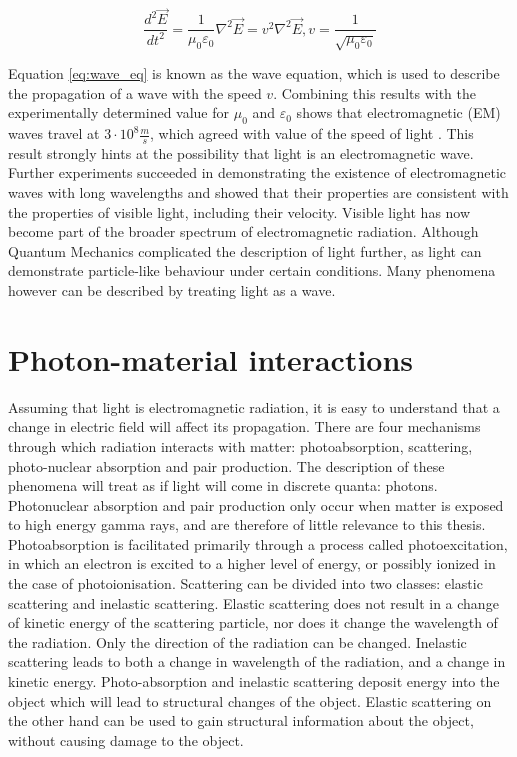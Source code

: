 \begin{equation}\label{eq:wave_eq}
\frac{d^2\vec{E}}{dt^2} = \frac{1}{\mu_0\varepsilon_0}\nabla^2 \vec{E} = v^2 \nabla^2 \vec{E},      v = \frac{1}{\sqrt{\mu_0\varepsilon_0}}
\end{equation}

Equation \ref{eq:wave_eq} is known as the wave equation, which is used to describe the propagation of a wave with the speed $v$. Combining this results with the experimentally determined value for $\mu_0$ and $\varepsilon_0$ shows that electromagnetic (EM) waves travel at \(3\cdot 10^8 \frac{m}{s}\), which agreed with value of the speed of light \cite{Froome1971}. This result strongly hints at the possibility that light is an electromagnetic wave. Further experiments succeeded in demonstrating the existence of electromagnetic waves with long wavelengths and showed that their properties are consistent with the properties of visible light, including their velocity. Visible light has now become part of the broader spectrum of electromagnetic radiation. Although Quantum Mechanics complicated the description of light further, as light can demonstrate particle-like behaviour under certain conditions. Many phenomena however can be described by treating light as a wave. 

\section{Photon-material interactions}
Assuming that light is electromagnetic radiation, it is easy to understand that a change in electric field will affect its propagation. There are four mechanisms through which radiation interacts with matter: photoabsorption, scattering, photo-nuclear absorption and pair production. The description of these phenomena will treat as if light will come in discrete quanta: photons. 
Photonuclear absorption and pair production only occur when matter is exposed to high energy gamma rays, and are therefore of little relevance to this thesis. Photoabsorption is facilitated primarily through a process called photoexcitation, in which an electron is excited to a higher level of energy, or possibly ionized in the case of photoionisation. Scattering can be divided into two classes: elastic scattering and inelastic scattering. Elastic scattering does not result in a change of kinetic energy of the scattering particle, nor does it change the wavelength of the radiation. Only the direction of the radiation can be changed. Inelastic scattering leads to both a change in wavelength of the radiation, and a change in kinetic energy. Photo-absorption and inelastic scattering deposit energy into the object which will lead to structural changes of the object. Elastic scattering on the other hand can be used to gain structural information about the object, without causing damage to the object. 

